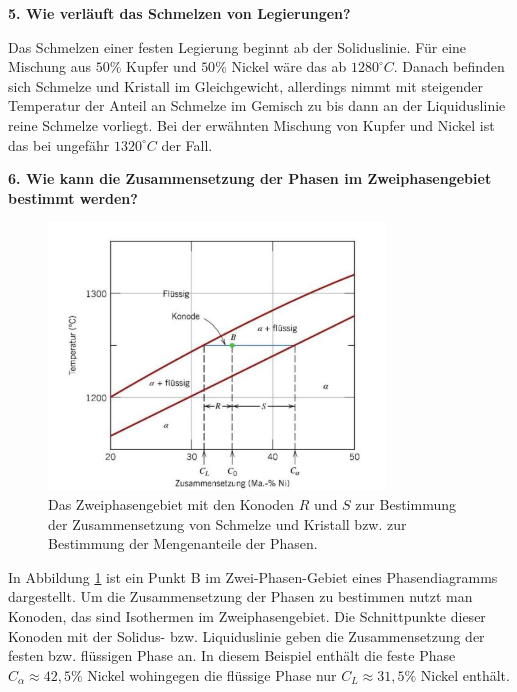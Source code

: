 \noindent\textbf{5. Wie verläuft das Schmelzen von Legierungen? }\\
\begin{addmargin}[25pt]{0pt}
Das Schmelzen einer festen Legierung beginnt ab der Soliduslinie. Für eine Mischung aus $50\%$ Kupfer und $50\%$ Nickel wäre das ab $1280^\circ \si{C}$. Danach befinden sich Schmelze und Kristall im Gleichgewicht, allerdings nimmt mit steigender Temperatur der Anteil an Schmelze im Gemisch zu bis dann an der Liquiduslinie reine Schmelze vorliegt. Bei der erwähnten Mischung von Kupfer und Nickel ist das bei ungefähr $1320^\circ \si{C}$ der Fall. \\
\end{addmargin}

\noindent\textbf{6. Wie kann die Zusammensetzung der Phasen
im Zweiphasengebiet bestimmt werden?}\\
\begin{addmargin}[25pt]{0pt}
\begin{figure}[h]
    \centering
    \includegraphics[width = 0.8\textwidth]{images/Materialwissenschaften/Zweiphasengebiet_Konode.jpeg}
    \caption{Das Zweiphasengebiet mit den Konoden $R$ und $S$ zur Bestimmung der Zusammensetzung von Schmelze und Kristall bzw. zur Bestimmung der Mengenanteile der Phasen.}
    \label{fig:zweiphasengebiet_konode}
\end{figure}
In Abbildung \ref{fig:zweiphasengebiet_konode} ist ein Punkt B im Zwei-Phasen-Gebiet eines Phasendiagramms dargestellt. Um die Zusammensetzung der Phasen zu bestimmen nutzt man Konoden, das sind Isothermen im Zweiphasengebiet. Die Schnittpunkte dieser Konoden mit der Solidus- bzw. Liquiduslinie geben die Zusammensetzung der festen bzw. flüssigen Phase an. In diesem Beispiel enthält die feste Phase $C_\alpha \approx 42,5\%$  Nickel wohingegen die flüssige Phase nur $C_L \approx 31,5\%$ Nickel enthält.\\
\end{addmargin}

